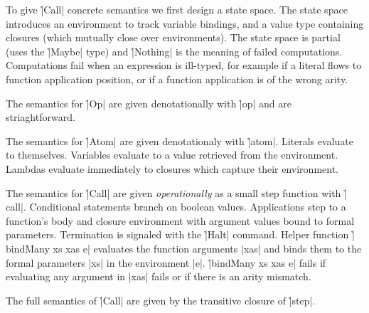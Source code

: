 To give \h|Call| concrete semantics we first design a state space.
%
The state space introduces an environment to track variable bindings, and a
value type containing closures (which mutually close over environments).
%
%
The state space is partial (uses the \h|Maybe| type) and \h|Nothing| is the meaning
of failed computations.
%
Computations fail when an expression is ill-typed, for example if a literal
flows to function application position, or if a function application is of the
wrong arity.


The semantics for \h|Op| are given denotationally with \h|op| and are
striaghtforward.
%

The semantics for \h|Atom| are given denotationaly with \h|atom|.
%
%
Literals evaluate to themselves.
%
Variables evaluate to a value retrieved from the environment.
%
Lambdas evaluate immediately to closures which capture their environment.


The semantics for \h|Call| are given \textit{operationally} as a small step
function with \h|call|.
%
%
Conditional statements branch on boolean values.
%
Applications step to a function's body and closure environment with argument
values bound to formal parameters.
%
Termination is signaled with the \h|Halt| command.
%
Helper function \h|bindMany xs xas e| evaluates the function arguments \p|xas| and
binds them to the formal parameters \p|xs| in the environment \p|e|.
%
%
\h|bindMany xs xas e| fails if evaluating any argument in \p|xas| fails or if
there is an arity mismatch.


The full semantics of \h|Call| are given by the transitive closure of \h|step|.
%
